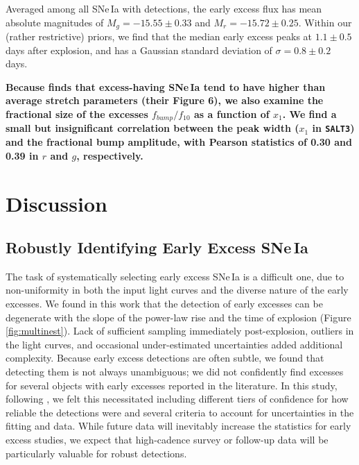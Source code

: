 \documentclass[twocolumn,twocolappendix, linenumbers]{aastex631} %
\begin{document}
Averaged among all \citet{Yao19} SNe\,Ia with detections, the early excess flux has mean absolute magnitudes of $M_g = -15.55 \pm 0.33$ and $M_r = -15.72 \pm 0.25$.  Within our (rather restrictive) priors, we find that the median early excess peaks at $1.1 \pm 0.5$ days after explosion, and has a Gaussian standard deviation of $\sigma = 0.8 \pm 0.2$ days. 

{\bf Because \citet{Deckers22} finds that excess-having SNe\,Ia tend to have higher than average stretch parameters (their Figure 6), we also examine the fractional size of the excesses $f_{bump}/f_{10}$ as a function of $x_1$.  We find a small but insignificant correlation between the peak width ($x_1$ in \texttt{SALT3}) and the fractional bump amplitude, with Pearson statistics of 0.30 and 0.39 in $r$ and $g$, respectively.}


\section{Discussion}
\label{sec:discussion}

\subsection{Robustly Identifying Early Excess SNe\,Ia}
\label{sec:excess_discussion}

The task of systematically selecting early excess SNe\,Ia is a difficult one, due to non-uniformity in both the input light curves and the diverse nature of the early excesses. We found in this work that the detection of early excesses can be degenerate with the slope of the power-law rise and the time of explosion (Figure \ref{fig:multinest}).  Lack of sufficient sampling immediately post-explosion, outliers in the light curves, and occasional under-estimated uncertainties added additional complexity.  Because early excess detections are often subtle, we found that detecting them is not always unambiguous; we did not confidently find excesses for several objects with early excesses reported in the literature.  In this study, following \citet{Burke22b}, we felt this necessitated including different tiers of confidence for how reliable the detections were and several criteria to account for uncertainties in the fitting and data.  While future data will inevitably increase the statistics for early excess studies, we expect that high-cadence survey or follow-up data will be particularly valuable for robust detections.
\end{document}
